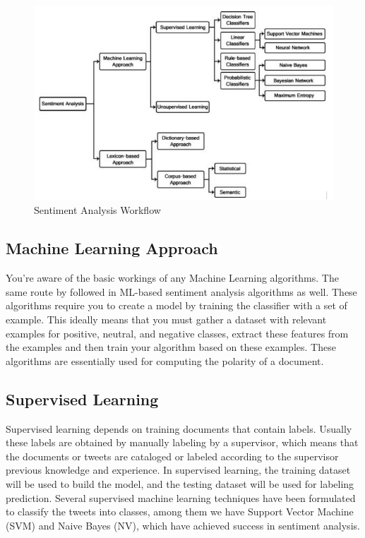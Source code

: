 \documentclass[preprint,12pt]{elsarticle}
\begin{document}
\begin{figure}[h]
\centering\includegraphics[width=1.2\linewidth]{Screenshot.png}
\caption{Sentiment Analysis Workflow}
\end{figure}

\subsection{\textbf{Machine Learning Approach}}
You’re aware of the basic workings of any Machine Learning algorithms. The same route by followed in ML-based sentiment analysis algorithms as well. These algorithms require you to create a model by training the classifier with a set of example. This ideally means that you must gather a dataset with relevant examples for positive, neutral, and negative classes, extract these features from the examples and then train your algorithm based on these examples. These algorithms are essentially used for computing the polarity of a document.



\subsection{\textbf{Supervised Learning}} 
Supervised learning depends on training documents that contain labels. Usually these labels are obtained by manually labeling by a supervisor, which means that the documents or tweets are cataloged or labeled according to the supervisor previous knowledge and experience. In supervised learning, the training dataset will be used to build the model, and the testing dataset will be used for labeling prediction. Several supervised machine learning techniques have been formulated to classify the tweets into classes, among them we have Support Vector Machine (SVM) and Naive Bayes (NV), which have achieved success in sentiment analysis. \\
\end{document}
